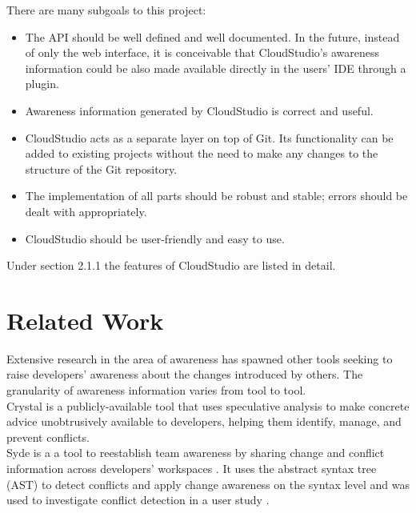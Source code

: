 There are many subgoals to this project:

\begin{itemize}

\item The API should be well defined and well documented. In the future, instead of only the web interface, it is conceivable that CloudStudio's awareness information could be also made available directly in the users' IDE through a plugin.
\item Awareness information generated by CloudStudio is correct and useful.
\item CloudStudio acts as a separate layer on top of Git. Its functionality can be added to existing projects without the need to make any changes to the structure of the Git repository.
\item The implementation of all parts should be robust and stable; errors should be dealt with appropriately.
\item CloudStudio should be user-friendly and easy to use.

\end{itemize}

Under section 2.1.1 the features of CloudStudio are listed in detail.







\section{Related Work}




Extensive research in the area of awareness has spawned other tools seeking to raise developers' awareness about the changes introduced by others. The granularity of awareness information varies from tool to tool. \\

Crystal is a publicly-available tool that uses speculative analysis to make concrete advice unobtrusively available to developers, helping them identify, manage, and prevent conflicts. \cite{ref25} \\

Syde is a a tool to reestablish team awareness by sharing change and conflict information across developers' workspaces \cite{ref23}. It uses the abstract syntax tree (AST) to detect conflicts and apply change awareness on the syntax level and was used to investigate conflict detection in a user study \cite{ref24}. \\

